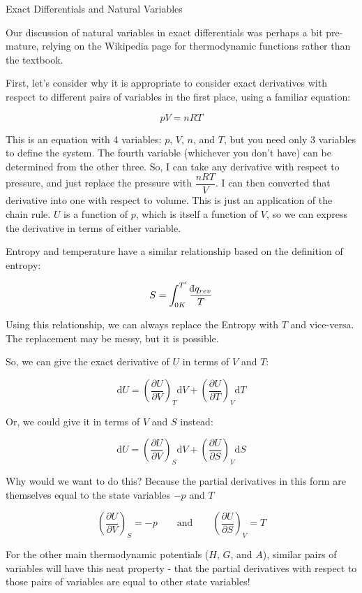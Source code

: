 \documentclass[12pt, openany, letterpaper]{memoir}
\begin{document}
\begin{center}
{\Large Exact Differentials and Natural Variables}
\end{center}

\noindent
Our discussion of natural variables in exact differentials was perhaps a bit pre-mature, relying on the Wikipedia page for thermodynamic functions rather than the textbook.

\noindent
First, let's consider why it is appropriate to consider exact derivatives with respect to different pairs of variables in the first place, using a familiar equation:

$$pV=nRT$$

\noindent
This is an equation with 4 variables: $p$, $V$, $n$, and $T$, but you need only 3 variables to define the system. The fourth variable (whichever you don't have) can be determined from the other three. So, I can take any derivative with respect to pressure, and just replace the pressure with $\dfrac{nRT}{V}$. I can then converted that derivative into one with respect to volume. This is just an application of the chain rule. $U$ is a function of $p$, which is itself a function of $V$, so we can express the derivative in terms of either variable.

\noindent
Entropy and temperature have a similar relationship based on the definition of entropy: 

$$S=\int_{0K}^{T^\prime}\dfrac{\dbar q_{rev}}{T}$$

\noindent
Using this relationship, we can always replace the Entropy with $T$ and vice-versa. The replacement may be messy, but it is possible.

\noindent
So, we can give the exact derivative of $U$ in terms of $V$ and $T$:

$$\mathrm{d}U = \left(\dfrac{\partial U}{\partial V}\right)_{\!\!T}\mathrm{d}V + \left(\dfrac{\partial U}{\partial T}\right)_{\!\!V}\mathrm{d}T$$
 
\noindent
Or, we could give it in terms of $V$ and $S$ instead:

$$\mathrm{d}U = \left(\dfrac{\partial U}{\partial V}\right)_{\!\!S}\mathrm{d}V + \left(\dfrac{\partial U}{\partial S}\right)_{\!\!V}\mathrm{d}S$$

\noindent
Why would we want to do this? Because the partial derivatives in this form are themselves equal to the state variables $-p$ and $T$

$$\left(\dfrac{\partial U}{\partial V}\right)_{\!\!S} = -p \hspace{2em}\mathrm{and}\hspace{2em} \left(\dfrac{\partial U}{\partial S}\right)_{\!\!V}=T$$

\noindent
For the other main thermodynamic potentials ($H$, $G$, and $A$), similar pairs of variables will have this neat property - that the partial derivatives with respect to those pairs of variables are equal to other state variables!
\end{document}
